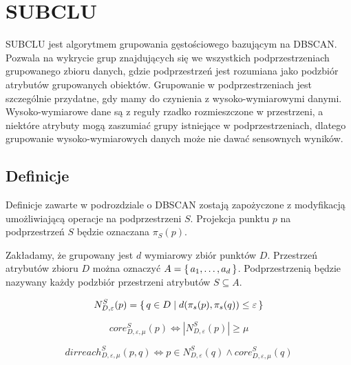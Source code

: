 \section{SUBCLU}
SUBCLU jest algorytmem grupowania gęstościowego bazującym na \linebreak DBSCAN. Pozwala na wykrycie grup znajdujących się we wszystkich podprzestrzeniach grupowanego zbioru danych, gdzie podprzestrzeń jest rozumiana jako podzbiór atrybutów grupowanych obiektów. Grupowanie w podprzestrzeniach jest szczególnie przydatne, gdy mamy do czynienia z \linebreak wysoko-wymiarowymi danymi. Wysoko-wymiarowe dane są z reguły rzadko rozmieszczone w przestrzeni, a niektóre atrybuty mogą zaszumiać grupy istniejące w podprzestrzeniach, dlatego grupowanie wysoko-wymiarowych danych może nie dawać sensownych wyników.

\subsection{Definicje}
Definicje zawarte w podrozdziale o DBSCAN zostają zapożyczone z modyfikacją umożliwiającą operacje na podprzestrzeni $ S $. Projekcja punktu $ p $ na podprzestrzeń $ S $ będzie oznaczana $\pi_S(p) $. 
\smallskip

\setcounter{definitioncounter}{0}
\newline
Zakładamy, że grupowany jest $ d $ wymiarowy zbiór punktów $ D $. Przestrzeń atrybutów zbioru $ D $ można oznaczyć $ A=\set{a_1,\dots,a_d} $. Podprzestrzenią będzie nazywany każdy podzbiór przestrzeni atrybutów $ S \subseteq A $.
\smallskip

\begin{equation}
	N^S_{D,\varepsilon}(p) = \set{q \in D | d(\pi_s(p), \pi_s(q)) \le \varepsilon}
\end{equation}

\begin{equation}
	core^S_{D,\varepsilon,\mu}(p) \iff |N^S_{D,\varepsilon}(p)| \ge \mu
\end{equation}

\begin{equation}
	dirreach^S_{D,\varepsilon,\mu}(p, q) \iff p \in N^S_{D,\varepsilon}(q) \land core^S_{D,\varepsilon,\mu}(q)
\end{equation}

